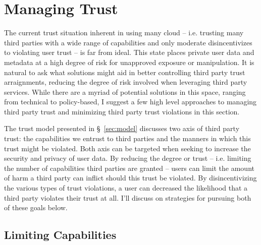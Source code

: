 \section{Managing Trust}
\label{sec:mitigation}

The current trust situation inherent in using many cloud --
i.e. trusting many third parties with a wide range of capabilities and
only moderate disincentivizes to violating user trust -- is far from
ideal. This state places private user data and metadata at a high
degree of risk for unapproved exposure or manipulation. It is natural
to ask what solutions might aid in better controlling third party
trust arraignments, reducing the degree of risk involved when
leveraging third party services. While there are a myriad of potential
solutions in this space, ranging from technical to policy-based, I
suggest a few high level approaches to managing third party trust and
minimizing third party trust violations in this section.

The trust model presented in \S~\ref{sec:model} discusses two axis of
third party trust: the capabilities we entrust to third parties and
the manners in which this trust might be violated. Both axis can be
targeted when seeking to increase the security and privacy of user
data. By reducing the degree or trust -- i.e. limiting the number of
capabilities third parties are granted -- users can limit the amount
of harm a third party can inflict should this trust be violated. By
disincentivizing the various types of trust violations, a user can
decreased the likelihood that a third party violates their trust at
all. I'll discuss on strategies for pursuing both of these goals
below.

\subsection{Limiting Capabilities}
\label{sec:mitigation:capabilities}

